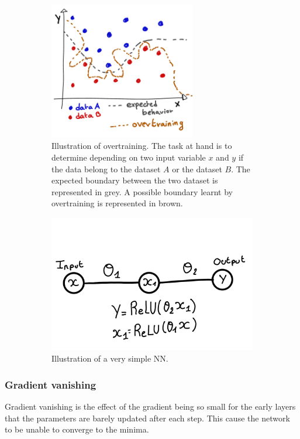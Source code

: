 \documentclass[../main.tex]{subfiles}
\begin{document}
\begin{figure}
  \centering
  \begin{subfigure}[t]{0.48\linewidth}
    \centering
    \includegraphics[height=6cm]{images/ml/overtraining.jpg}
    \caption{Illustration of overtraining. The task at hand is to determine depending on two input variable $x$ and $y$ if the data belong to the dataset $A$ or the dataset $B$. The expected boundary between the two dataset is represented in grey. A possible boundary learnt by overtraining is represented in brown.}
    \label{fig:ml:overtraining}
  \end{subfigure}
  \hfill
  \begin{subfigure}[t]{0.48\linewidth}
    \centering
    \includegraphics[height=6cm]{images/ml/vanishing_illus.jpg}
    \caption{Illustration of a very simple NN.}
    \label{fig:ml:vanishing}
  \end{subfigure}
  \caption{}
\end{figure}

\subsubsection{Gradient vanishing}

Gradient vanishing is the effect of the gradient being so small for the early layers that the parameters are barely updated after each step. This cause the network to be unable to converge to the minima.
\end{document}
